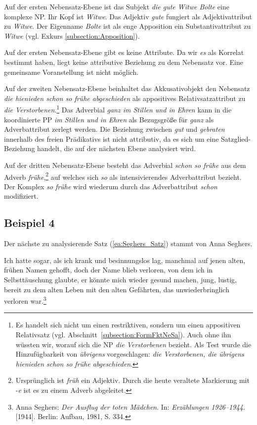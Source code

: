 Auf der ersten Nebensatz-Ebene ist das Subjekt \textit{die gute Witwe Bolte} eine komplexe NP. Ihr Kopf ist \textit{Witwe}. Das Adjektiv \textit{gute} fungiert als Adjektivattribut zu \textit{Witwe}. Der Eigenname \textit{Bolte} ist als enge Apposition ein Substantivattribut zu \textit{Witwe} (vgl. Exkurs \ref{subsection:Apposition}).

Auf der ersten Nebensatz-Ebene gibt es keine Attribute. Da wir \textit{es} als Korrelat bestimmt haben, liegt keine attributive Beziehung zu dem Nebensatz vor. Eine gemeinsame Voranstellung ist nicht möglich.

Auf der zweiten Nebensatz-Ebene beinhaltet das Akkusativobjekt den Nebensatz \textit{die hienieden schon so frühe abgeschieden} als appositives Relativsatzattribut zu \textit{die Verstorbenen}.\footnote{Es handelt sich nicht um einen restriktiven, sondern um einen appositiven Relativsatz (vgl. Abschnitt~\ref{subsection:FormFktNeSa}). Auch ohne ihn wüssten wir, worauf sich die NP \textit{die Verstorbenen} bezieht. Als Test wurde die Hinzufügbarkeit von \textit{übrigens} vorgeschlagen: \textit{die Verstorbenen, die übrigens hienieden schon so frühe abgeschieden}.}  Das Adverbial \textit{ganz im Stillen und in Ehren} kann in die koordinierte PP \textit{im Stillen und in Ehren} als Bezugsgröße für \textit{ganz} als Adverbattribut zerlegt werden. Die Beziehung zwischen \textit{gut} und \textit{gebraten} innerhalb des freien Prädikativs ist nicht attributiv, da es sich um eine Satzglied-Beziehung handelt, die auf der nächsten Ebene analysiert wird.

Auf der dritten Nebensatz-Ebene besteht das Adverbial \textit{schon so frühe} aus dem Adverb \textit{frühe},\footnote{Ursprünglich ist \textit{früh} ein Adjektiv. Durch die heute veraltete Markierung mit -\textit{e} ist es zu einem Adverb abgeleitet.} auf welches sich \textit{so} als intensivierendes Adverbattribut bezieht. Der Komplex \textit{so frühe} wird wiederum durch das Adverbattribut \textit{schon} modifiziert.


\subsection{Beispiel 4}\label{subsection:Bsp4}

Der nächste zu analysierende Satz (\ref{ea:Seghers_Satz}) stammt von Anna Seghers.

\ea \label{ea:Seghers_Satz} Ich hatte sogar, als ich krank und besinnungslos lag, manchmal auf jenen alten, frühen Namen gehofft, doch der Name blieb verloren, von dem ich in Selbsttäuschung glaubte, er könnte mich wieder gesund machen, jung, lustig, bereit zu dem alten Leben mit den alten Gefährten, das unwiederbringlich verloren war.\footnote{Anna Seghers: \textit{Der Ausflug der toten Mädchen}. In: \textit{Erzählungen 1926--1944}. [1944]. Berlin: Aufbau, 1981, S. 334.} 
\z 

